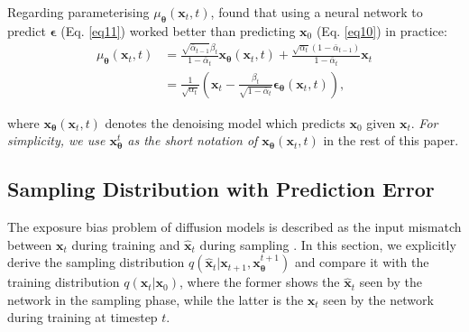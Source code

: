 \documentclass{article} \usepackage{iclr2024_conference,times}
\begin{document}
Regarding parameterising $\mu_{\pmb{\theta}}(\pmb{x}_t, t)$, \citet{DDPM} found that using a neural network to predict $\pmb{\epsilon}$ (Eq. \ref{eq11}) worked better than predicting $\pmb{x}_0$ (Eq. \ref{eq10}) in practice:
\begin{align}
\mu_{\pmb{\theta}}(\pmb{x}_t, t) & = \frac{\sqrt{\bar{\alpha}_{t-1}} \beta_{t}}{1-\bar{\alpha}_{t}} \pmb{x_{\theta}}(\pmb{x}_t, t) + \frac{\sqrt{\alpha_{t}}(1-\bar{\alpha}_{t-1})}{1-\bar{\alpha}_{t}} \pmb{x}_{t} \label{eq10} \\
& = \frac{1}{\sqrt{\alpha_t}}(\pmb{x}_t - \frac{\beta_t}{\sqrt{1-\bar{\alpha}_t}} \pmb{\epsilon_{\theta}}(\pmb{x}_t, t)), \label{eq11}
\end{align}

\noindent
where $\pmb{x_{\theta}}(\pmb{x}_t, t)$ denotes the denoising model which predicts $\pmb{x}_0$ given $\pmb{x}_t$. \textit{For simplicity, we use $\pmb{x}^{t}_{\pmb{\theta}}$ as the short notation of $\pmb{x_{\theta}}(\pmb{x}_t, t)$} in the rest of this paper.



\subsection{Sampling Distribution with Prediction Error}
\label{sec: Sampling Distribution with Prediction Error}

The exposure bias problem of diffusion models is described as the input mismatch between $\pmb{x}_t$ during training and $\hat{\pmb{x}}_t$ during sampling \citep{ning2023input}. In this section, we explicitly derive the sampling distribution $q(\hat{\pmb{x}}_{t} | \pmb{x}_{t+1}, \pmb{x}^{t+1}_{\pmb{\theta}})$ and compare it with the training distribution $q(\pmb{x}_{t} | \pmb{x}_0)$, where the former shows the $\hat{\pmb{x}}_t$ seen by the network in the sampling phase, while the latter is the $\pmb{x}_t$ seen by the network during training at timestep $t$.
\end{document}
